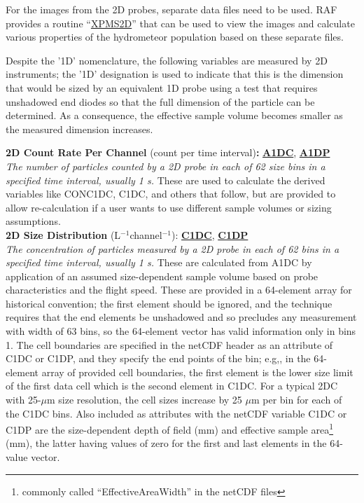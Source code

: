 For the images from the 2D probes, separate data files need to be
used. RAF provides a routine ``\href{https://www.eol.ucar.edu/software/xpms2d}{XPMS2D}''
that can be used to view the images and calculate various properties
of the hydrometeor population based on these separate  files.

\label{Despite-the-'1D'}Despite the '1D' nomenclature, the following
variables are measured by 2D instruments; the '1D' designation is
used to indicate that this is the dimension that would be sized by
an equivalent 1D probe using a test that requires unshadowed end diodes
so that the full dimension of the particle can be determined. As a
consequence, the effective sample volume becomes smaller as the measured
dimension increases.
\begin{hangparagraphs}
\textbf{2D Count Rate Per Channel }(count per time interval)\textbf{:}\hypertarget{A1DC}{}\hypertarget{A1DP}{}\textbf{
}\textbf{\uline{A1DC}}, \textbf{\uline{A1DP}}\\
\emph{The number of particles counted by a 2D
probe in each of 62 size bins in a specified time interval, usually
1 s.} These are used to calculate the derived variables like CONC1DC,
C1DC, and others that follow, but are provided to allow re-calculation
if a user wants to use different sample volumes or sizing assumptions.\\

\textbf{2D Size Distribution }(L$^{-1}$channel$^{-1}$):\hypertarget{C1DC}{}\hypertarget{C1DP}{}\textbf{
}\textbf{\uline{C1DC}}, \textbf{\uline{C1DP}}\\
\emph{The concentration of particles
measured by a 2D probe in each of 62 bins in a specified time interval,
usually 1 s.} These are calculated from A1DC by application of an
assumed size-dependent sample volume based on probe characteristics
and the flight speed. These are provided in a 64-element array for
historical convention; the first element should be ignored, and the
technique requires that the end elements be unshadowed and so precludes
any measurement with width of 63 bins, so the 64-element vector has
valid information only in bins 1. The cell boundaries
are specified in the netCDF header as an attribute of C1DC or C1DP,
and they specify the end points of the bin; e.g,, in the 64-element
array of provided cell boundaries, the first element is the lower
size limit of the first data cell which is the second element in C1DC.
For a typical 2DC with 25-$\mu$m size resolution, the cell sizes
increase by 25 $\mu$m per bin for each of the C1DC bins. Also included
as attributes with the netCDF variable C1DC or C1DP are the size-dependent
depth of field (mm) and effective sample area\footnote{commonly called ``EffectiveAreaWidth'' in the netCDF files}
(mm), the latter having values of zero for the first and last elements
in the 64-value vector. \\


\end{hangparagraphs}
